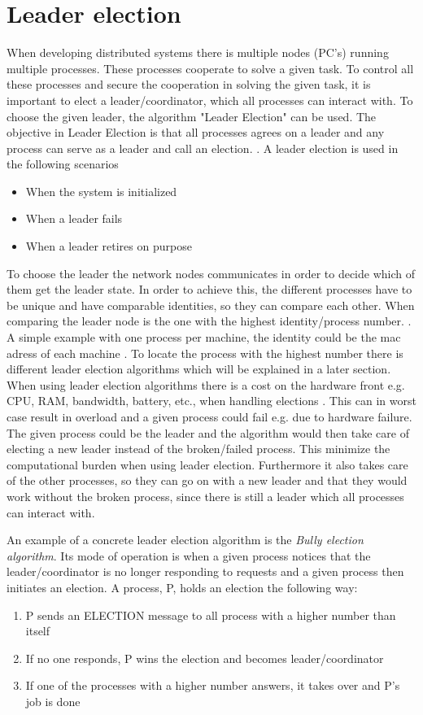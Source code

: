 \documentclass[Main]{subfiles}
\begin{document}
\section{Leader election}
When developing distributed systems there is multiple nodes (PC's) running multiple processes. These processes cooperate to solve a given task. To control all these processes and secure the cooperation in solving the given task, it is important to elect a leader/coordinator, which all processes can interact with\cite{EAlgInDS}. To choose the given leader, the algorithm "Leader Election" can be used.  The objective in Leader Election is that all processes agrees on a leader and any process can serve as a leader and call an election. \cite{RMI-slides}. A leader election is used in the following scenarios
\begin{itemize}
\item When the system is initialized
\item When a leader fails
\item When a leader retires on purpose
\end{itemize}
To choose the leader the network nodes communicates in order to decide which of them get the leader state. In order to achieve this, the different processes have to be unique and have comparable identities, so they can compare  each other. When comparing the leader node is the one with the highest identity/process number. \cite{wiki-Leader}. A simple example with one process per machine, the identity could be the mac adress of each machine \cite{ElectionAlgorithm}.
To locate the process with the highest number there is different leader election algorithms which will be explained in a later section.\\

When using leader election algorithms there is a cost on the hardware front e.g. CPU, RAM, bandwidth, battery, etc., when handling elections \cite{RMI-slides}. This can in worst case result in overload and a given process could fail e.g. due to hardware failure. The given process could be the leader and the algorithm would then take care of electing a new leader instead of the broken/failed process. This minimize the computational burden when using leader election. Furthermore it also takes care of the other processes, so they can go on with a new leader and that they would work without the broken process, since there is still a leader which all processes can interact with.\cite{EAlgInDS}

An example of a concrete leader election algorithm is the \textit{Bully election algorithm}. Its mode of operation is when a given process notices that the leader/coordinator is no longer responding to requests and a given process then initiates an election. A process, P,  holds an election the following way:
\begin{enumerate}
\item P sends an ELECTION message to all process with a higher number than itself
\item If no one responds, P wins the election and becomes leader/coordinator
\item If one of the processes with a higher number answers, it takes over and P's job is done 
\end{enumerate}
\end{document}
